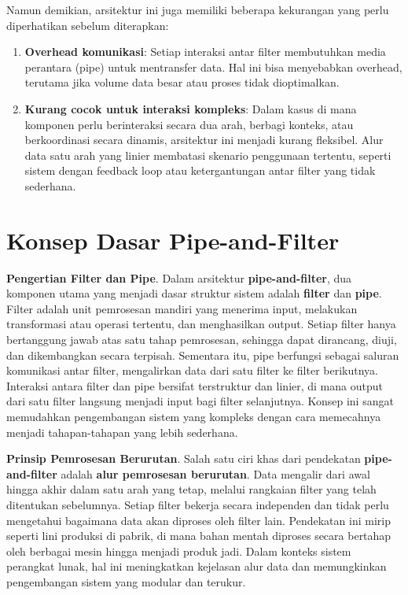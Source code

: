 Namun demikian, arsitektur ini juga memiliki beberapa kekurangan yang perlu diperhatikan sebelum diterapkan:

\begin{enumerate}
	\item \textbf{Overhead komunikasi}: Setiap interaksi antar filter membutuhkan media perantara (pipe) untuk mentransfer data. Hal ini bisa menyebabkan overhead, terutama jika volume data besar atau proses tidak dioptimalkan.
	
	\item \textbf{Kurang cocok untuk interaksi kompleks}: Dalam kasus di mana komponen perlu berinteraksi secara dua arah, berbagi konteks, atau berkoordinasi secara dinamis, arsitektur ini menjadi kurang fleksibel. Alur data satu arah yang linier membatasi skenario penggunaan tertentu, seperti sistem dengan feedback loop atau ketergantungan antar filter yang tidak sederhana.
\end{enumerate}


\section{Konsep Dasar Pipe-and-Filter}

\textbf{Pengertian Filter dan Pipe}.  
Dalam arsitektur \textbf{pipe-and-filter}, dua komponen utama yang menjadi dasar struktur sistem adalah \textbf{filter} dan \textbf{pipe}. Filter adalah unit pemrosesan mandiri yang menerima input, melakukan transformasi atau operasi tertentu, dan menghasilkan output. Setiap filter hanya bertanggung jawab atas satu tahap pemrosesan, sehingga dapat dirancang, diuji, dan dikembangkan secara terpisah. Sementara itu, pipe berfungsi sebagai saluran komunikasi antar filter, mengalirkan data dari satu filter ke filter berikutnya. Interaksi antara filter dan pipe bersifat terstruktur dan linier, di mana output dari satu filter langsung menjadi input bagi filter selanjutnya. Konsep ini sangat memudahkan pengembangan sistem yang kompleks dengan cara memecahnya menjadi tahapan-tahapan yang lebih sederhana.

\textbf{Prinsip Pemrosesan Berurutan}.  
Salah satu ciri khas dari pendekatan \textbf{pipe-and-filter} adalah \textbf{alur pemrosesan berurutan}. Data mengalir dari awal hingga akhir dalam satu arah yang tetap, melalui rangkaian filter yang telah ditentukan sebelumnya. Setiap filter bekerja secara independen dan tidak perlu mengetahui bagaimana data akan diproses oleh filter lain. Pendekatan ini mirip seperti lini produksi di pabrik, di mana bahan mentah diproses secara bertahap oleh berbagai mesin hingga menjadi produk jadi. Dalam konteks sistem perangkat lunak, hal ini meningkatkan kejelasan alur data dan memungkinkan pengembangan sistem yang modular dan terukur.


